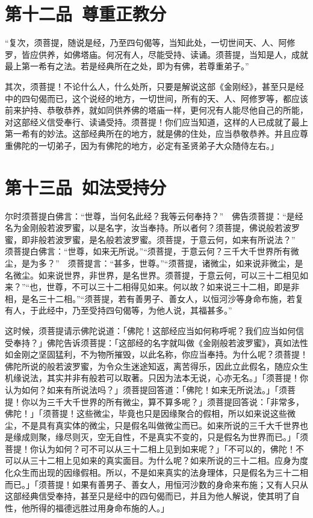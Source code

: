 \documentclass[12pt,twoside,openany]{book}
\newcommand{\kai}[1]{{\CJKfamily{kai}#1}}
\begin{document}
\chapter{第十二品\ 尊重正教分}
\begin{pinyinscope}
“复次，须菩提，随说是经，乃至四句偈等，当知此处，一切世间天、人、阿修罗，皆应供养，如佛塔庙。何况有人，尽能受持、读诵。须菩提，当知是人，成就最上第一希有之法。若是经典所在之处，即为有佛，若尊重弟子。”
\end{pinyinscope}

\kai{其次，须菩提！不论什么人，什么处所，只要是解说这部《金刚经》，甚至只是经中的四句偈而已，这个说经的地方，一切世间，所有的天、人、阿修罗等，都应该前来护持、恭敬恭养，就如同供养佛的塔庙一样，更何况有人能尽他自己的所能，对这部经义信受奉行、读诵受持。须菩提！你们应当知道，这样的人已成就了最上第一希有的妙法。这部经典所在的地方，就是佛的住处，应当恭敬恭养。并且应尊重佛陀的一切弟子，因为有佛陀的地方，必定有圣贤弟子大众随侍左右。」}

\chapter{第十三品\ 如法受持分}
\begin{pinyinscope}
尔时须菩提白佛言：“世尊，当何名此经？我等云何奉持？”　佛告须菩提：“是经名为金刚般若波罗蜜，以是名字，汝当奉持。所以者何？须菩提，佛说般若波罗蜜，即非般若波罗蜜，是名般若波罗蜜。须菩提，于意云何，如来有所说法？”　须菩提白佛言：“世尊，如来无所说。”“须菩提，于意云何？三千大千世界所有微尘，是为多？”　须菩提言：“甚多，世尊。”“须菩提，诸微尘，如来说非微尘，是名微尘。如来说世界，非世界，是名世界。须菩提，于意云何，可以三十二相见如来？”“也，世尊，不可以三十二相得见如来。何以故？如来说三十二相，即是非相，是名三十二相。”“须菩提，若有善男子、善女人，以恒河沙等身命布施，若复有人，于此经中，乃至受持四句偈等，为他人说，其福甚多。”
\end{pinyinscope}

\kai{这时候，须菩提请示佛陀说道：「佛陀！这部经应当如何称呼呢？我们应当如何信受奉持？」佛陀告诉须菩提：「这部经的名字就叫做《金刚般若波罗蜜》，真如法性如金刚之坚固猛利，不为物所摧毁，以此名称，你应当奉持。为什么呢？须菩提！佛陀所说的般若波罗蜜，为令众生迷途知返，离苦得乐，因此立此假名，随应众生机缘说法，其实并非有般若可以取著。只因为法本无说，心亦无名。」「须菩提！你认为如何？如来有所说法吗？」须菩提回答道：「佛陀！如来无所说法。」「须菩提！你以为三千大千世界的所有微尘，算不算多呢？」须菩提回答说：「非常多，佛陀！」「须菩提！这些微尘，毕竟也只是因缘聚合的假相，所以如来说这些微尘，不是具有真实体的微尘，只是假名叫做微尘而已。如来所说的三千大千世界也是缘成则聚，缘尽则灭，空无自性，不是真实不变的，只是假名为世界而已。」「须菩提！你认为如何？可不可以从三十二相上见到如来呢？」「不可以的，佛陀！不可以从三十二相上见如来的真实面目。为什么呢？如来所说的三十二相。应身为度化众生而出现的因缘假相。所以，不是如来真实的法身理体，只是假名为三十二相而已。」「须菩提！如果有善男子、善女人，用恒河沙数的身命来布施；又有人只从这部经典信受奉持，甚至只是经中的四句偈而已，并且为他人解说，使其明了自性，他所得的福德远胜过用身命布施的人。」}
\end{document}
